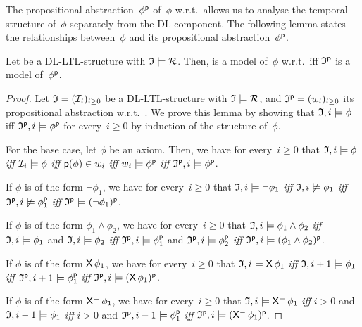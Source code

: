 \noindent
The propositional abstraction~$\phi^\mathsf{p}$ of~$\phi$ w.r.t.~\psf allows us to
analyse the temporal structure of~$\phi$ separately from the DL-component.
%
The following lemma states the relationships between~$\phi$ and its
propositional abstraction~$\phi^\mathsf{p}$.

\begin{lemma}\label{lem:prop-abs}
    Let \Imf be a DL-LTL-structure with $\mathfrak{I}\models\mathcal{R}$.  Then, \Imf is a
    model of~$\phi$ w.r.t.~\Rmc iff $\mathfrak{I}^\mathsf{p}$ is a model of~$\phi^\mathsf{p}$.
\end{lemma}

\begin{proof}
    Let $\mathfrak{I}=(\mathcal{I}_i)_{i\ge 0}$ be a DL-LTL-structure with $\mathfrak{I}\models\mathcal{R}$,
    and $\mathfrak{I}^\mathsf{p}=(w_i)_{i\ge 0}$ its propositional abstraction w.r.t.~\psf.
    We prove this lemma by showing that $\mathfrak{I},i\models\phi$ iff
    $\mathfrak{I}^\mathsf{p},i\models\phi^\mathsf{p}$ for every~$i\ge 0$ by induction of the
    structure of~$\phi$.

    For the base case, let $\phi$ be an axiom.  Then, we have for every~$i\ge 0$
    that $\mathfrak{I},i\models\phi$ \emph{iff} $\mathcal{I}_i\models\phi$ \emph{iff}
    $\mathsf{p}(\phi)\in w_i$ \emph{iff} $w_i\models\phi^\mathsf{p}$ \emph{iff}
    $\mathfrak{I}^\mathsf{p},i\models\phi^\mathsf{p}$.

    If $\phi$ is of the form $\lnot\phi_1$, we have for every~$i\ge 0$ that
    $\mathfrak{I},i\models\lnot\phi_1$ \emph{iff} $\mathfrak{I},i\not\models\phi_1$ \emph{iff}
    $\mathfrak{I}^\mathsf{p},i\not\models\phi_1^\mathsf{p}$ \emph{iff}
    $\mathfrak{I}^\mathsf{p}\models(\lnot\phi_1)^\mathsf{p}$.

    If $\phi$ is of the form $\phi_1\land\phi_2$, we have for every~$i\ge 0$
    that $\mathfrak{I},i\models\phi_1\land\phi_2$ \emph{iff} $\mathfrak{I},i\models\phi_1$ and
    $\mathfrak{I},i\models\phi_2$ \emph{iff} $\mathfrak{I}^\mathsf{p},i\models\phi_1^\mathsf{p}$ and
    $\mathfrak{I}^\mathsf{p},i\models\phi_2^\mathsf{p}$ \emph{iff}
    $\mathfrak{I}^\mathsf{p},i\models(\phi_1\land\phi_2)^\mathsf{p}$.

    If $\phi$ is of the form $\operatorname{\mathsf{X}}\phi_1$, we have for every~$i\ge 0$ that
    $\mathfrak{I},i\models\operatorname{\mathsf{X}}\phi_1$ \emph{iff} $\mathfrak{I},i+1\models\phi_1$ \emph{iff}
    $\mathfrak{I}^\mathsf{p},i+1\models\phi_1^\mathsf{p}$ \emph{iff}
    $\mathfrak{I}^\mathsf{p},i\models(\operatorname{\mathsf{X}}\phi_1)^\mathsf{p}$.

    If $\phi$ is of the form $\Previous\phi_1$, we have for every~$i\ge 0$ that
    $\Imf,i\models\Previous\phi_1$ \emph{iff} $i>0$ and $\mathfrak{I},i-1\models\phi_1$
    \emph{iff} $i>0$ and
    $\mathfrak{I}^\mathsf{p},i-1\models\phi_1^\mathsf{p}$ \emph{iff}
    $\Imf^\psf,i\models(\Previous\phi_1)^\psf$.


\end{proof}
